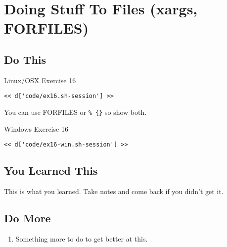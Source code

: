 \chapter{Doing Stuff To Files (xargs, FORFILES)}

\section{Do This}

\begin{code}{Linux/OSX Exercise 16}
\begin{Verbatim}
<< d['code/ex16.sh-session'] >>
\end{Verbatim}
\end{code}

You can use FORFILES or \verb|% {}| so show both.

\begin{code}{Windows Exercise 16}
\begin{Verbatim}
<< d['code/ex16-win.sh-session'] >>
\end{Verbatim}
\end{code}

\section{You Learned This}

This is what you learned.  Take notes and come back if you didn't get it.

\section{Do More}

\begin{enumerate}
\item Something more to do to get better at this.
\end{enumerate}

